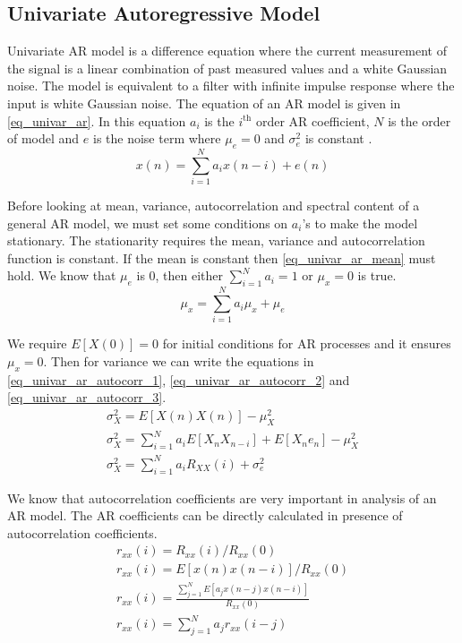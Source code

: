 \subsection{Univariate Autoregressive Model}
Univariate AR model is a difference equation where the current measurement of the signal is a linear combination of past measured values and a white Gaussian noise. The model is equivalent to a filter with infinite impulse response where the input is white Gaussian noise. The equation of an AR model is given in \eqref{eq_univar_ar}. In this equation $a_{i}$ is the $i^{\text{th}}$ order AR coefficient, $N$ is the order of model and $e$ is the noise term where $\mu_e=0$ and $\sigma_e^2$ is constant \cite{random-signals}. 
\begin{equation}\label{eq_univar_ar}
x(n) = \sum_{i=1}^{N}{a_ix(n-i)} + e(n) 
\end{equation} \par
Before looking at mean, variance, autocorrelation and spectral content of a general AR model, we must set some conditions on $a_{i}$'s to make the model stationary. The stationarity requires the mean, variance and autocorrelation function is constant. If the mean is constant then \eqref{eq_univar_ar_mean} must hold. We know that $\mu_e$ is 0, then either $\sum_{i=1}^{N}{a_i} = 1$ or $\mu_x = 0$ is true. 
\begin{equation}\label{eq_univar_ar_mean}
\mu_x = \sum_{i=1}^{N}{a_i\mu_x} + \mu_e 
\end{equation} \par
We require $E[X(0)] = 0$ for initial conditions for AR processes and it ensures $\mu_x=0$. Then for variance we can write the equations in \eqref{eq_univar_ar_autocorr_1}, \eqref{eq_univar_ar_autocorr_2} and \eqref{eq_univar_ar_autocorr_3}.
\begin{align}
\sigma_{X}^2 = E[X(n)X(n)] - \mu_{X}^2 \label{eq_univar_ar_autocorr_1} \\
\sigma_{X}^2 = \sum_{i=1}^{N}a_iE[X_nX_{n-i}] + E[X_ne_n] - \mu_{X}^2 \label{eq_univar_ar_autocorr_2}\\
\sigma_{X}^2 = \sum_{i=1}^{N}a_iR_{XX}(i) + \sigma_e^2 \label{eq_univar_ar_autocorr_3}
\end{align} \par
We know that autocorrelation coefficients are very important in analysis of an AR model. The AR coefficients can be directly calculated in presence of autocorrelation coefficients.
\begin{align}
	r_{xx}(i) = R_{xx}(i)/R_{xx}(0) \label{eq_univar_ar_corrcoef_1}\\
	r_{xx}(i) = E[x(n)x(n-i)]/R_{xx}(0) \label{eq_univar_ar_corrcoef_2} \\
	r_{xx}(i) = \frac{\sum_{j=1}^{N}{E[a_jx(n-j)x(n-i)]}}{R_{xx}(0)} \label{eq_univar_ar_corrcoef_3}\\
	r_{xx}(i) = \sum_{j=1}^{N}{a_jr_{xx}(i-j)} \label{eq_univar_ar_corrcoef_4}
\end{align} \par
